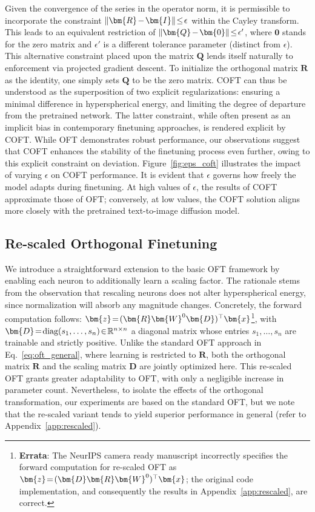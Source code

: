 Given the convergence of the series in the operator norm, it is permissible to incorporate the constraint $\thickmuskip=2mu \medmuskip=2mu\|\bm{R}-\bm{I}\|\leq\epsilon$ within the Cayley transform. This leads to an equivalent restriction of $\thickmuskip=2mu \medmuskip=2mu\|\bm{Q}-\bm{0}\|\leq\epsilon'$, where $\bm{0}$ stands for the zero matrix and $\epsilon'$ is a different tolerance parameter (distinct from $\epsilon$). This alternative constraint placed upon the matrix $\bm{Q}$ lends itself naturally to enforcement via projected gradient descent. To initialize the orthogonal matrix $\bm{R}$ as the identity, one simply sets $\bm{Q}$ to be the zero matrix. COFT can thus be understood as the superposition of two explicit regularizations: ensuring a minimal difference in hyperspherical energy, and limiting the degree of departure from the pretrained network. The latter constraint, while often present as an implicit bias in contemporary finetuning approaches, is rendered explicit by COFT. While OFT demonstrates robust performance, our observations suggest that COFT enhances the stability of the finetuning process even further, owing to this explicit constraint on deviation. Figure~\ref{fig:eps_coft} illustrates the impact of varying $\epsilon$ on COFT performance. It is evident that $\epsilon$ governs how freely the model adapts during finetuning. At high values of $\epsilon$, the results of COFT approximate those of OFT; conversely, at low values, the COFT solution aligns more closely with the pretrained text-to-image diffusion model.

\subsection{Re-scaled Orthogonal Finetuning}

We introduce a straightforward extension to the basic OFT framework by enabling each neuron to additionally learn a scaling factor. The rationale stems from the observation that rescaling neurons does not alter hyperspherical energy, since normalization will absorb any magnitude changes. Concretely, the forward computation follows: $\thickmuskip=2mu \medmuskip=2mu\bm{z}=(\bm{R}\bm{W}^0\bm{D})^\top\bm{x}$\footnote{\textbf{Errata}: The NeurIPS camera ready manuscript incorrectly specifies the forward computation for re-scaled OFT as $\thickmuskip=2mu \medmuskip=2mu\bm{z}=(\bm{D}\bm{R}\bm{W}^0)^\top\bm{x}$; the original code implementation, and consequently the results in Appendix~\ref{app:rescaled}, are correct.}, with $\thickmuskip=2mu \medmuskip=2mu \bm{D} = \text{diag}(s_1,\ldots,s_n) \in \mathbb{R}^{n\times n}$ a diagonal matrix whose entries $s_1,\ldots,s_n$ are trainable and strictly positive. Unlike the standard OFT approach in Eq.~\eqref{eq:oft_general}, where learning is restricted to $\bm{R}$, both the orthogonal matrix $\bm{R}$ and the scaling matrix $\bm{D}$ are jointly optimized here. This re-scaled OFT grants greater adaptability to OFT, with only a negligible increase in parameter count. Nevertheless, to isolate the effects of the orthogonal transformation, our experiments are based on the standard OFT, but we note that the re-scaled variant tends to yield superior performance in general (refer to Appendix~\ref{app:rescaled}).

